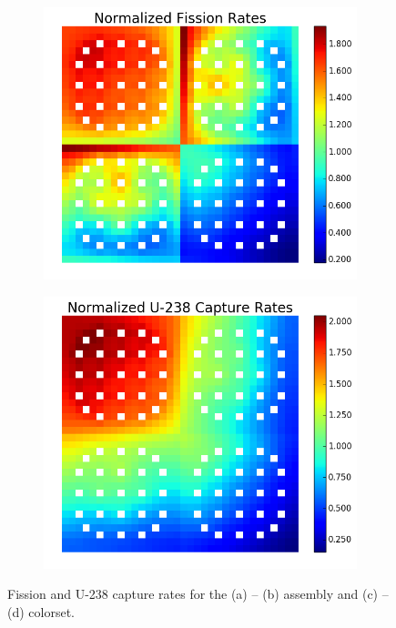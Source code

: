 \begin{figure}[h!]
\begin{subfigure}{0.45\textwidth}
\end{subfigure}
\begin{subfigure}{0.45\textwidth}
  \centering
  \includegraphics[width=\linewidth]{figures/reflector/fission-rates}
  \caption{}
  \label{fig:fiss-reflector}
\end{subfigure}%
\begin{subfigure}{0.45\textwidth}
  \centering
  \includegraphics[width=\linewidth]{figures/reflector/capture-rates}
  \caption{}
  \label{fig:capt-reflector}
\end{subfigure}
\caption{Fission and U-238 capture rates for the (a) -- (b) assembly and (c) -- (d) colorset.}
\label{fig:fiss-capt-rates}
\end{figure}

